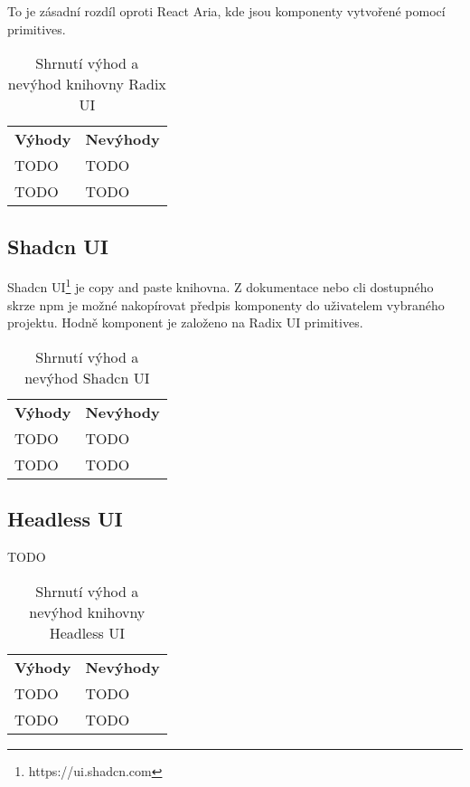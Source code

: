 To je zásadní rozdíl oproti React Aria, kde jsou komponenty vytvořené pomocí primitives.

\begin{table}[ht]
    \begin{ctucolortab}
        \begin{tabularx}{\textwidth}{Y Y}
            \bfseries \textcolor{OK}{Výhody} & \bfseries \textcolor{NOT_OK}{Nevýhody} \\\Midrule{}
            TODO                             & TODO                                   \\
            TODO                             & TODO
        \end{tabularx}
    \end{ctucolortab}
    \caption{Shrnutí výhod a nevýhod knihovny Radix UI}
\end{table}

\subsection{Shadcn UI}

Shadcn UI\footnote{https://ui.shadcn.com} je copy and paste knihovna.
Z dokumentace nebo \gls{cli} dostupného skrze npm je možné nakopírovat předpis komponenty do uživatelem vybraného projektu.
Hodně komponent je založeno na Radix UI primitives.

\begin{table}[ht]
    \begin{ctucolortab}
        \begin{tabularx}{\textwidth}{Y Y}
            \bfseries \textcolor{OK}{Výhody} & \bfseries \textcolor{NOT_OK}{Nevýhody} \\\Midrule{}
            TODO                             & TODO                                   \\
            TODO                             & TODO
        \end{tabularx}
    \end{ctucolortab}
    \caption{Shrnutí výhod a nevýhod Shadcn UI}
\end{table}

\subsection{Headless UI}

TODO

\begin{table}[ht]
    \begin{ctucolortab}
        \begin{tabularx}{\textwidth}{Y Y}
            \bfseries \textcolor{OK}{Výhody} & \bfseries \textcolor{NOT_OK}{Nevýhody} \\\Midrule{}
            TODO                             & TODO                                   \\
            TODO                             & TODO
        \end{tabularx}
    \end{ctucolortab}
    \caption{Shrnutí výhod a nevýhod knihovny Headless UI}
\end{table}

